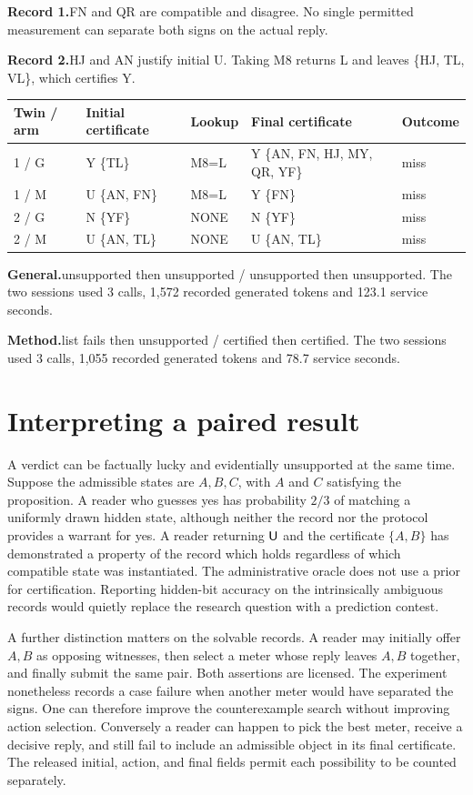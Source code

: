 \documentclass[12pt,letterpaper]{article}
\newcommand{\reading}[2]{\par\smallskip\textsf{\color{accent}\bfseries #1}\enspace #2\par}
\begin{document}
\reading{Record 1.}{FN and QR are compatible and disagree. No single permitted measurement can separate both signs on the actual reply.}

\reading{Record 2.}{HJ and AN justify initial U. Taking M8 returns L and leaves \{HJ, TL, VL\}, which certifies Y.}

\begin{center}\footnotesize\setlength{\tabcolsep}{4pt}\begin{tabularx}{\linewidth}{lYlYl}\toprule
Twin / arm & Initial certificate & Lookup & Final certificate & Outcome\\ / G & Y \{TL\} & M8=L & Y \{AN, FN, HJ, MY, QR, YF\} & miss\\
1 / M & U \{AN, FN\} & M8=L & Y \{FN\} & miss\\
2 / G & N \{YF\} & NONE & N \{YF\} & miss\\
2 / M & U \{AN, TL\} & NONE & U \{AN, TL\} & miss\\
\bottomrule\end{tabularx}\end{center}


\reading{General.}{unsupported then unsupported / unsupported then unsupported. The two sessions used 3 calls, 1,572 recorded generated tokens and 123.1 service seconds.}

\reading{Method.}{list fails then unsupported / certified then certified. The two sessions used 3 calls, 1,055 recorded generated tokens and 78.7 service seconds.}
\section{Interpreting a paired result}

A verdict can be factually lucky and evidentially unsupported at the same time. Suppose the admissible states are $A,B,C$, with $A$ and $C$ satisfying the proposition. A reader who guesses yes has probability $2/3$ of matching a uniformly drawn hidden state, although neither the record nor the protocol provides a warrant for yes. A reader returning $\mathsf U$ and the certificate $\{A,B\}$ has demonstrated a property of the record which holds regardless of which compatible state was instantiated. The administrative oracle does not use a prior for certification. Reporting hidden-bit accuracy on the intrinsically ambiguous records would quietly replace the research question with a prediction contest.

A further distinction matters on the solvable records. A reader may initially offer $A,B$ as opposing witnesses, then select a meter whose reply leaves $A,B$ together, and finally submit the same pair. Both assertions are licensed. The experiment nonetheless records a case failure when another meter would have separated the signs. One can therefore improve the counterexample search without improving action selection. Conversely a reader can happen to pick the best meter, receive a decisive reply, and still fail to include an admissible object in its final certificate. The released initial, action, and final fields permit each possibility to be counted separately.
\end{document}
